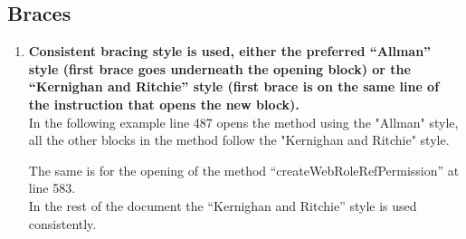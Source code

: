 \documentclass[a4paper,11pt]{report} %
\begin{document}
		\subsection*{Braces}\begin{enumerate}[resume]
			\item \textbf{Consistent bracing style is used, either the preferred ``Allman'' style (first brace goes underneath the opening block) or the ``Kernighan and Ritchie'' style (first brace is on the same line of the instruction that opens the new block).}\smallskip \\
				In the following example line 487 opens the method using the "Allman" style, all the other blocks in the method follow the "Kernighan and Ritchie" style.
				
				The same is for the opening of the method ``createWebRoleRefPermission'' at line 583.\\ In the rest of the document the ``Kernighan and Ritchie'' style is used consistently.
		\end{enumerate}
		
\end{document}
